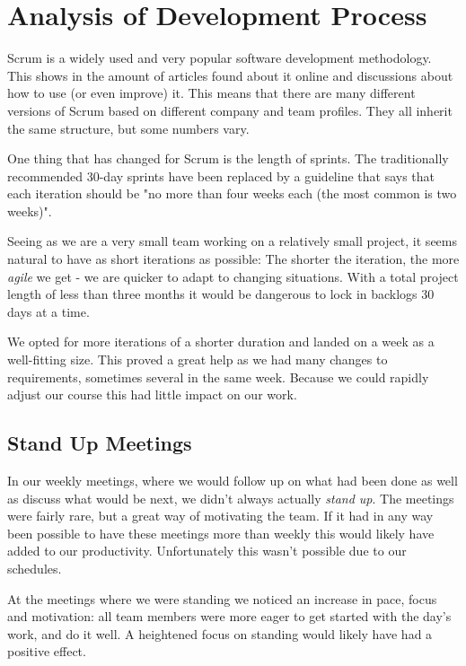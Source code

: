 \section{Analysis of Development Process}
\label{sec:AnalysisOrganizational}

Scrum is a widely used and very popular software development methodology. This shows in the amount
of articles found about it online and discussions about how to use (or even improve) it. This means
that there are many different versions of Scrum based on different company and team profiles. They
all inherit the same structure, but some numbers vary.

One thing that has changed for Scrum is the length of sprints. The traditionally recommended 30-day
sprints have been replaced by a guideline that says that each iteration should be "no more than four
weeks each (the most common is two weeks)"\cite{scrumprime}.

Seeing as we are a very small team working on a relatively small project, it seems natural to have as 
short iterations as possible: The shorter the iteration, the more \emph{agile} we get - we are quicker
to adapt to changing situations. With a total project length of less than three months it would be
dangerous to lock in backlogs 30 days at a time.

We opted for more iterations of a shorter duration and landed on a week as a well-fitting size. This
proved a great help as we had many changes to requirements, sometimes several in the same week. Because
we could rapidly adjust our course this had little impact on our work.

\subsection{Stand Up Meetings}

In our weekly meetings, where we would follow up on what had been done as well as discuss what would be
next, we didn't always actually \emph{stand up}. The meetings were fairly rare, but a great way of
motivating the team. If it had in any way been possible to have these meetings more than weekly this would
likely have added to our productivity. Unfortunately this wasn't possible due to our schedules.

At the meetings where we were standing we noticed an increase in pace, focus and motivation: all team members
were more eager to get started with the day's work, and do it well. A heightened focus on standing would
likely have had a positive effect.

